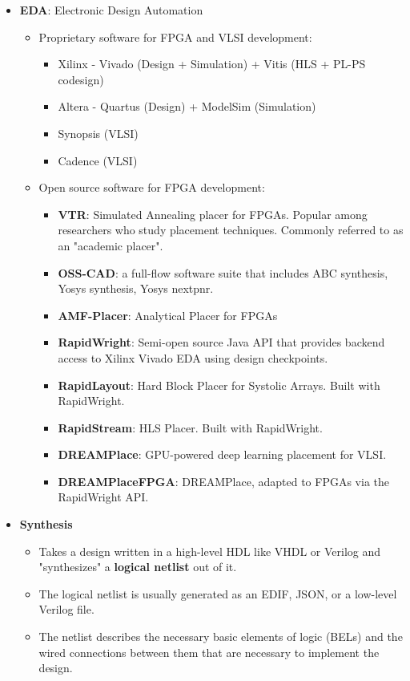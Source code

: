 \documentclass{article}
\begin{document}
\begin{itemize}[label={\textbullet}, left=0.25cm]
    \item \textbf{EDA}: Electronic Design Automation
    \begin{itemize}[label={--}, left=0.25cm]
        \item Proprietary software for FPGA and VLSI development:
        \begin{itemize}[label={$\cdot$}, left=0.25cm]
            \item Xilinx - Vivado (Design + Simulation) + Vitis (HLS + PL-PS codesign)
            \item Altera - Quartus (Design) + ModelSim (Simulation)
            \item Synopsis (VLSI)
            \item Cadence (VLSI)
        \end{itemize}
        \item Open source software for FPGA development:
        \begin{itemize}[label={$\cdot$}, left=0.25cm]
            \item \textbf{VTR}: Simulated Annealing placer for FPGAs. Popular among researchers who study placement techniques. 
                Commonly referred to as an "academic placer".
            \item \textbf{OSS-CAD}: a full-flow software suite that includes ABC synthesis, Yosys synthesis, Yosys nextpnr.
            \item \textbf{AMF-Placer}: Analytical Placer for FPGAs
            \item \textbf{RapidWright}: Semi-open source Java API that provides backend access to Xilinx Vivado EDA using design checkpoints.
            \item \textbf{RapidLayout}: Hard Block Placer for Systolic Arrays. Built with RapidWright.
            \item \textbf{RapidStream}: HLS Placer. Built with RapidWright.
            \item \textbf{DREAMPlace}: GPU-powered deep learning placement for VLSI.
            \item \textbf{DREAMPlaceFPGA}: DREAMPlace, adapted to FPGAs via the RapidWright API.
        \end{itemize}
    \end{itemize}
    
    \item \textbf{Synthesis}
    \begin{itemize}[label={--}, left=0.25cm]
        \item Takes a design written in a high-level HDL like VHDL or Verilog and "synthesizes" a \textbf{logical netlist} out of it. 
        \item The logical netlist is usually generated as an EDIF, JSON, or a low-level Verilog file. 
        \item The netlist describes the necessary basic elements of logic (BELs) and the wired connections between them that are necessary to implement the design.
    \end{itemize}


\end{itemize}
\end{document}
